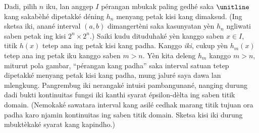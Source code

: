 \documentclass[../../../include/open-logic-section]{subfiles}
\begin{document}
Dadi, pilih $n$ iku, lan anggep $I$ pérangan mbukak paling gedhé
saka $\unitline$ kang sakabèhé dipetakké déning $h_n$ menyang
petak kisi kang dimaksud. (Ing sketsa iki, anané interval
$(a,b)$ dimangertèni saka kasunyatan yèn $h_n$ ngliwati
saben petak ing kisi $2^n\times 2^n$.) Saiki kudu dituduhaké
yèn kanggo saben $x \in I$, titik $h(x)$ tetep ana ing petak
kisi kang padha. Kanggo \emph{iki}, cukup yèn $h_m(x)$ tetep
ana ing petak iku kanggo saben $m > n$. Yèn kita deleng
$h_m$ kanggo $m > n$, miturut pola gambar,
``pérangan kang padha'' saka interval satuan tetep dipetakké
menyang petak kisi kang padha, mung jaluré saya dawa lan
mlengkung. Pangrembug iki nerangaké intuisi pambangunané,
nanging durung dadi bukti kontinuitas fungsi iki kanthi syarat
épsilon-dèlta ing saben titik domain.
(Nemokaké sawatara interval kang asilé cedhak marang titik tujuan ora padha karo njamin kontinuitas ing saben titik domain. Sketsa kisi iki durung mbuktèkaké syarat kang kapindho.)
\end{document}
